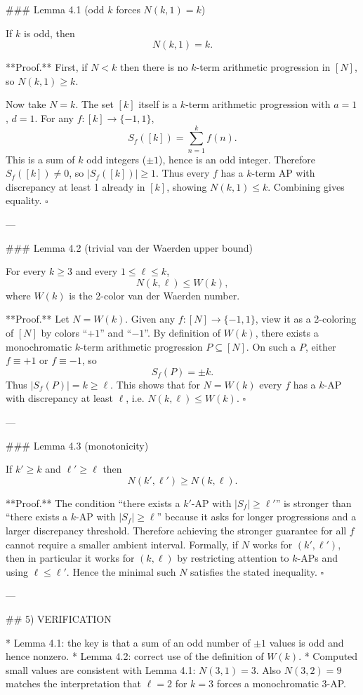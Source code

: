 ### Lemma 4.1 (odd $k$ forces $N(k,1)=k$)

If $k$ is odd, then
\[
N(k,1)=k.
\]

**Proof.**
First, if $N<k$ then there is no $k$-term arithmetic progression in $[N]$, so $N(k,1)\ge k$.

Now take $N=k$. The set $[k]$ itself is a $k$-term arithmetic progression with $a=1$, $d=1$.
For any $f:[k]\to\{-1,1\}$,
\[
S_f([k])=\sum_{n=1}^k f(n).
\]
This is a sum of $k$ odd integers ($\pm 1$), hence is an odd integer. Therefore $S_f([k])\ne 0$, so $|S_f([k])|\ge 1$.
Thus every $f$ has a $k$-term AP with discrepancy at least 1 already in $[k]$, showing $N(k,1)\le k$.
Combining gives equality.
$\square$

---

### Lemma 4.2 (trivial van der Waerden upper bound)

For every $k\ge 3$ and every $1\le \ell\le k$,
\[
N(k,\ell)\le W(k),
\]
where $W(k)$ is the 2-color van der Waerden number.

**Proof.**
Let $N=W(k)$. Given any $f:[N]\to\{-1,1\}$, view it as a 2-coloring of $[N]$ by colors “$+1$” and “$-1$”.
By definition of $W(k)$, there exists a monochromatic $k$-term arithmetic progression $P\subseteq[N]$.
On such a $P$, either $f\equiv +1$ or $f\equiv -1$, so
\[
S_f(P)=\pm k.
\]
Thus $|S_f(P)|=k\ge \ell$. This shows that for $N=W(k)$ every $f$ has a $k$-AP with discrepancy at least $\ell$, i.e. $N(k,\ell)\le W(k)$.
$\square$

---

### Lemma 4.3 (monotonicity)

If $k'\ge k$ and $\ell'\ge \ell$ then
\[
N(k',\ell')\ge N(k,\ell).
\]

**Proof.**
The condition “there exists a $k'$-AP with $|S_f|\ge \ell'$” is stronger than “there exists a $k$-AP with $|S_f|\ge \ell$” because it asks for longer progressions and a larger discrepancy threshold. Therefore achieving the stronger guarantee for all $f$ cannot require a smaller ambient interval.
Formally, if $N$ works for $(k',\ell')$, then in particular it works for $(k,\ell)$ by restricting attention to $k$-APs and using $\ell\le \ell'$. Hence the minimal such $N$ satisfies the stated inequality.
$\square$

---

## 5) VERIFICATION

* Lemma 4.1: the key is that a sum of an odd number of $\pm 1$ values is odd and hence nonzero.
* Lemma 4.2: correct use of the definition of $W(k)$.
* Computed small values are consistent with Lemma 4.1: $N(3,1)=3$. Also $N(3,2)=9$ matches the interpretation that $\ell=2$ for $k=3$ forces a monochromatic 3-AP.

